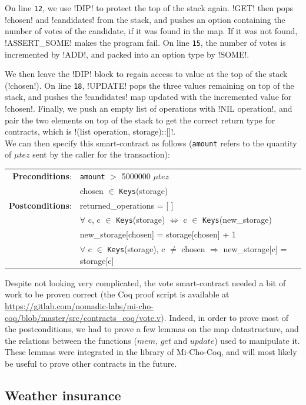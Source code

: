 \documentclass{report}
\begin{document}
On line \texttt{12}, we use !DIP! to protect the top of the
stack again. !GET! then pops !chosen! and
!candidates! from  the stack, and pushes an
option containing the number of votes of the candidate, if it was
found in the map. If it was not found, !ASSERT_SOME! makes
the program fail. On line \texttt{15}, the number of votes is
incremented by !ADD!, and packed into an option type by
!SOME!.

We then leave the !DIP! block to regain access to
value at the top of the stack (!chosen!). On line
\texttt{18}, !UPDATE! pops the three values remaining
on top of the stack, and pushes the !candidates! map updated
with the incremented value for !chosen!. Finally, we push an
empty list of operations with !NIL operation!, and pair the
two elements on top of the stack to get the correct return type for contracts, which is !(list operation, storage)::[]!.\\

We can then specify this smart-contract as follows (\texttt{amount} refers to the quantity of $\mu tez$ sent by the caller for the transaction):
{\small
\begin{longtable}{rl}
  \textbf{Preconditions}: & \texttt{amount} $>$ 5000000 $\mu tez$\\
  & chosen $\in$ \texttt{Keys}(storage)\\
  \textbf{Postconditions}: & returned\_operations = [ ]\\
  & $\forall$ c, c $\in$ \texttt{Keys}(storage) $\iff$ c $\in$ \texttt{Keys}(new\_storage)\\
  & new\_storage[chosen] = storage[chosen] + 1\\
  & $\forall$ c $\in$ \texttt{Keys}(storage), c $\neq$ chosen $\Rightarrow$ new\_storage[c] = storage[c]
\end{longtable}}

Despite not looking very complicated, the vote smart-contract needed a bit of work to be proven correct (the Coq proof script is available at \url{https://gitlab.com/nomadic-labs/mi-cho-coq/blob/master/src/contracts_coq/vote.v}). Indeed, in order to prove most of the postconditions, we had to prove a few lemmas on the map datastructure, and the relations between the functions ($mem$, $get$ and $update$) used to manipulate it. These lemmas were integrated in the library of Mi-Cho-Coq, and will most likely be useful to prove other contracts in the future.

\subsection{Weather insurance}
\label{contractsSpec}
\end{document}
